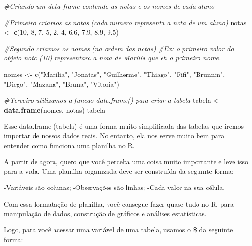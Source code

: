 \documentclass[
]{book}
\newenvironment{Shaded}{\begin{snugshade}}{\end{snugshade}}
\newcommand{\CommentTok}[1]{\textcolor[rgb]{0.56,0.35,0.01}{\textit{#1}}}
\newcommand{\DecValTok}[1]{\textcolor[rgb]{0.00,0.00,0.81}{#1}}
\newcommand{\FloatTok}[1]{\textcolor[rgb]{0.00,0.00,0.81}{#1}}
\newcommand{\FunctionTok}[1]{\textcolor[rgb]{0.13,0.29,0.53}{\textbf{#1}}}
\newcommand{\NormalTok}[1]{#1}
\newcommand{\OtherTok}[1]{\textcolor[rgb]{0.56,0.35,0.01}{#1}}
\newcommand{\SpecialCharTok}[1]{\textcolor[rgb]{0.81,0.36,0.00}{\textbf{#1}}}
\newcommand{\StringTok}[1]{\textcolor[rgb]{0.31,0.60,0.02}{#1}}
\begin{document}
\begin{Shaded}
\begin{Highlighting}[]
\CommentTok{\#Criando um data frame contendo as notas e os nomes de cada aluno}

\CommentTok{\#Primeiro criamos as notas (cada numero representa a nota de um aluno)}
\NormalTok{notas }\OtherTok{\textless{}{-}} \FunctionTok{c}\NormalTok{(}\DecValTok{10}\NormalTok{, }\DecValTok{8}\NormalTok{, }\DecValTok{7}\NormalTok{, }\DecValTok{5}\NormalTok{, }\DecValTok{2}\NormalTok{, }\DecValTok{4}\NormalTok{, }\FloatTok{6.6}\NormalTok{, }\FloatTok{7.9}\NormalTok{, }\FloatTok{8.9}\NormalTok{, }\FloatTok{9.5}\NormalTok{) }

\CommentTok{\#Segundo criamos os nomes (na ordem das notas)}
\CommentTok{\#Ex: o primeiro valor do objeto nota (10) representara a nota de Marilia que eh o primeiro nome.}

\NormalTok{nomes }\OtherTok{\textless{}{-}} \FunctionTok{c}\NormalTok{(}\StringTok{"Marilia"}\NormalTok{, }\StringTok{"Jonatas"}\NormalTok{, }\StringTok{"Guilherme"}\NormalTok{, }\StringTok{"Thiago"}\NormalTok{, }
\StringTok{"Fifi"}\NormalTok{, }\StringTok{"Brunnin"}\NormalTok{, }\StringTok{"Diego"}\NormalTok{, }\StringTok{"Mazana"}\NormalTok{, }\StringTok{"Bruna"}\NormalTok{, }\StringTok{"Vitoria"}\NormalTok{)}

\CommentTok{\#Terceiro utilizamos a funcao data.frame() para criar a tabela}
\NormalTok{tabela }\OtherTok{\textless{}{-}} \FunctionTok{data.frame}\NormalTok{(nomes, notas)}
\NormalTok{tabela}
\end{Highlighting}
\end{Shaded}

Esse data.frame (tabela) é uma forma muito simplificada das tabelas que iremos importar de nossos dados reais. No entanto, ela nos serve muito bem para entender como funciona uma planilha no R.

A partir de agora, quero que você perceba uma coisa muito importante e leve isso para a vida. Uma planilha organizada deve ser construída da seguinte forma:

-Variáveis são colunas;
-Observações são linhas;
-Cada valor na sua célula.

Com essa formatação de planilha, você consegue fazer quase tudo no R, para manipulação de dados, construção de gráficos e análises estatísticas.

Logo, para você acessar uma variável de uma tabela, usamos o \textbf{\$} da seguinte forma:

\begin{Shaded}
\end{Shaded}
\end{document}
